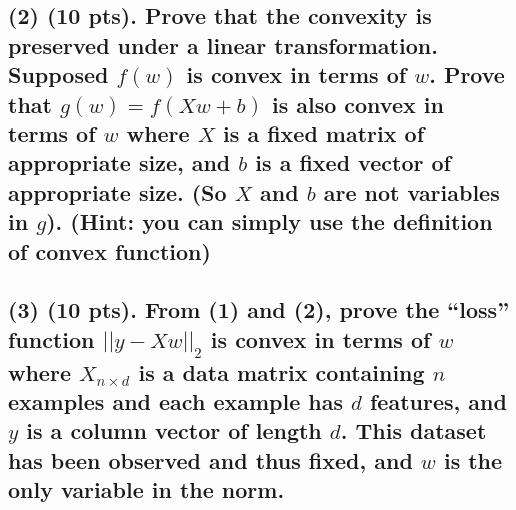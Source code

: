 \subsection{(2) (10 pts). Prove that the convexity is preserved under a linear transformation. Supposed $f(w)$ is convex in terms of $w$. Prove that $g(w)=f(X w + b)$ is also convex in terms of $w$ where $X$ is a fixed matrix of appropriate size, and $b$ is a fixed vector of appropriate size. (So $X$ and $b$ are not variables in $g$). (Hint: you can simply use the definition of convex function)}

\subsection{(3) (10 pts). From (1) and (2), prove the “loss” function $||y-Xw||_2$ is convex in terms of $w$ where $X_{n \times d}$ is a data matrix containing $n$ examples and each example has $d$ features, and $y$ is a column vector of length $d$. This dataset has been observed and thus
fixed, and $w$ is the only variable in the norm.}
